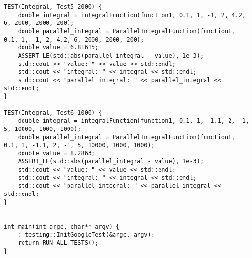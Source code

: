 \documentclass{report}
\begin{document}
\begin{lstlisting}
TEST(Integral, Test5_2000) {
    double integral = integralFunction(function1, 0.1, 1, -1, 2, 4.2, 6, 2000, 2000, 200);
    double parallel_integral = ParallelIntegralFunction(function1, 0.1, 1, -1, 2, 4.2, 6, 2000, 2000, 200);
    double value = 6.81615;
    ASSERT_LE(std::abs(parallel_integral - value), 1e-3);
    std::cout << "value: " << value << std::endl;
    std::cout << "integral: " << integral << std::endl;
    std::cout << "parallel integral: " << parallel_integral << std::endl;
}

TEST(Integral, Test6_1000) {
    double integral = integralFunction(function1, 0.1, 1, -1.1, 2, -1, 5, 10000, 1000, 1000);
    double parallel_integral = ParallelIntegralFunction(function1, 0.1, 1, -1.1, 2, -1, 5, 10000, 1000, 1000);
    double value = 8.2863;
    ASSERT_LE(std::abs(parallel_integral - value), 1e-3);
    std::cout << "value: " << value << std::endl;
    std::cout << "integral: " << integral << std::endl;
    std::cout << "parallel integral: " << parallel_integral << std::endl;
}


int main(int argc, char** argv) {
    ::testing::InitGoogleTest(&argc, argv);
    return RUN_ALL_TESTS();
}

\end{lstlisting}
\end{document}
